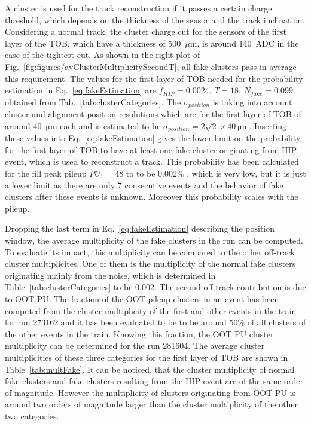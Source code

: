 A cluster is used for the track reconstruction if it passes a certain charge threshold, which depends on the thickness of the sensor and the track inclination. Considering a normal track, the cluster charge cut for the sensors of the first layer of the TOB, which have a thickness of 500~$\mu$m, is around 140~ADC in the case of the tightest cut. As shown in the right plot of Fig.~\ref{fig:figures/avClusterMultiplicitySecondT}, all fake clusters pass in average this requirement. The values for the first layer of TOB needed for the probability estimation in Eq.~\ref{eq:fakeEstimation} are $f_{HIP} = 0.0024$, $T = 18$, $N_{fake} =0.099$ obtained from Tab.~\ref{tab:clusterCategories}. The $\sigma_{position}$ is taking into account cluster and alignment position resolutions which are for the first layer of TOB of around 40~$\mathrm{\mu m}$ each and is estimated to be $\sigma_{position} = 2 \sqrt{2} \times 40 ~\mathrm{\mu m}$. Inserting these values into Eq.~\ref{eq:fakeEstimation} gives the lower limit on the probability for the first layer of TOB to have at least one fake cluster originating from HIP event,  which is used to reconstruct a track. This probability has been calculated for the fill peak pileup $PU_{1} = 48$ to to be $0.002\%$ , which is very low, but it is just a lower limit as there are only 7 consecutive events and the behavior of fake clusters after these events is unknown. Moreover this probability scales with the pileup. %

Dropping the last term  in Eq.~\ref{eq:fakeEstimation} describing the position window, the average multiplicity  of the fake clusters in the run can be computed. To evaluate its impact, this multiplicity can be compared to the other off-track cluster multiplicites. One of them is the multiplicity of the normal fake clusters originating mainly from the noise, which is determined in Table~\ref{tab:clusterCategories} to be 0.002. The second off-track contribution is due to OOT PU. The fraction of the OOT pileup clusters in an event has been computed from the cluster multiplicity of the first and other events in the train for run 273162 and it has been evaluated to be to be around 50\% of all clusters of the other events in the train. Knowing this fraction, the OOT PU cluster multiplicity can be determined for the run 281604. The average cluster multiplicities of these three categories for the first layer of TOB are shown in Table~\ref{tab:multFake}. It can be noticed, that the cluster multiplicity of normal fake clusters and fake clusters resulting from the HIP event are of the same order of magnitude. However the multiplicity of clusters originating from OOT PU is around two orders of magnitude larger than the cluster multiplicity of the other two categories.  


